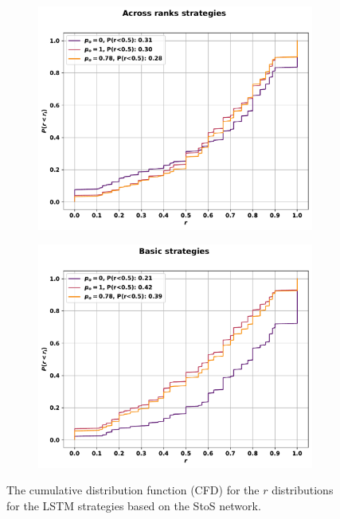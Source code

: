 \begin{figure}[!htbp]
\begin{subfigure}{.45\textwidth}
    \includegraphics[width=\textwidth]{src/chapters/07/img/cfd_to_sequence_across_ranks_strategies.pdf}
    \end{subfigure}\hfill
    \begin{subfigure}{.45\textwidth}
    \includegraphics[width=\textwidth]{src/chapters/07/img/cfd_to_sequence_basic_strategies.pdf}
    \end{subfigure}
    \caption{The cumulative distribution function (CFD)
    for the \(r\) distributions for the LSTM strategies based on the StoS
    network.}\label{fig:cfd_s_to_s}
\end{figure}

